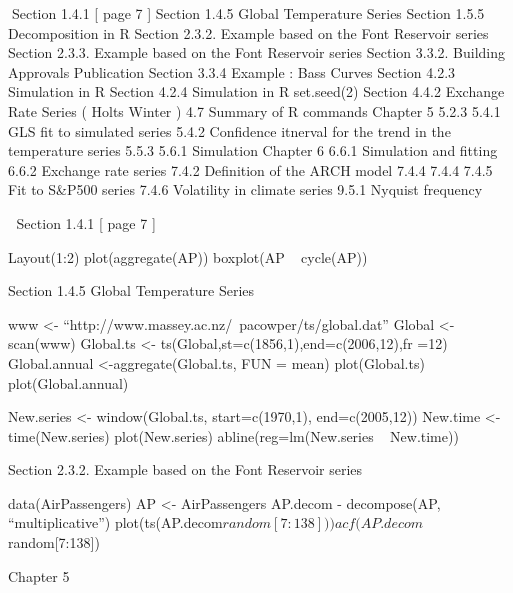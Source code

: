 
Section 1.4.1 [ page 7 ]
Section 1.4.5 Global Temperature Series
Section 1.5.5 Decomposition in R
Section 2.3.2. Example based on the Font Reservoir series
Section 2.3.3. Example based on the Font Reservoir series
Section 3.3.2. Building Approvals Publication
Section 3.3.4 Example : Bass Curves
Section 4.2.3 Simulation in R
Section 4.2.4 Simulation in R
set.seed(2)
Section 4.4.2 Exchange Rate Series ( Holts Winter )
4.7 Summary of R commands
Chapter 5
5.2.3
5.4.1 GLS fit to simulated series
5.4.2 Confidence itnerval for the trend in the temperature series
5.5.3
5.6.1 Simulation
Chapter 6
6.6.1 Simulation and fitting
6.6.2 Exchange rate series
7.4.2 Definition of the ARCH model
7.4.4
7.4.4
7.4.5 Fit to S&P500 series
7.4.6 Volatility in climate series
9.5.1  Nyquist frequency


Section 1.4.1 [ page 7 ]

Layout(1:2)
plot(aggregate(AP))
boxplot(AP ~ cycle(AP))

Section 1.4.5 Global Temperature Series

www <- “http://www.massey.ac.nz/~pacowper/ts/global.dat”
Global <-scan(www)
Global.ts <- ts(Global,st=c(1856,1),end=c(2006,12),fr =12)
Global.annual <-aggregate(Global.ts, FUN = mean)
plot(Global.ts)
plot(Global.annual)


New.series <- window(Global.ts, start=c(1970,1), end=c(2005,12))
New.time <- time(New.series)
plot(New.series)
abline(reg=lm(New.series ~ New.time))


Section 2.3.2. Example based on the Font Reservoir series

data(AirPassengers)
AP <- AirPassengers
AP.decom - decompose(AP, “multiplicative”)
plot(ts(AP.decom$random[7:138]))
acf(AP.decom$random[7:138])



Chapter 5

